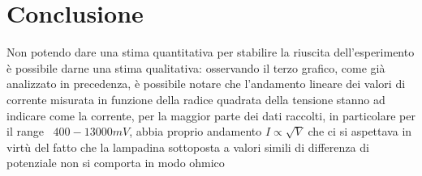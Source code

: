 \documentclass[10pt,twocolumn]{article}
\begin{document}
\section{Conclusione}
Non potendo dare una stima quantitativa per stabilire la riuscita
 dell'esperimento è possibile darne una stima qualitativa: osservando 
 il terzo grafico, come già analizzato in precedenza,
  è possibile notare che l'andamento lineare dei valori di corrente misurata in 
  funzione della radice quadrata della tensione stanno ad indicare come la corrente, 
  per la maggior parte dei dati raccolti, in particolare per il range  $400-13000mV$, 
  abbia proprio andamento $I \propto \sqrt{V}$ che ci si aspettava in virtù del fatto
   che la lampadina sottoposta a valori simili di differenza di potenziale non si comporta in modo ohmico
\end{document}
